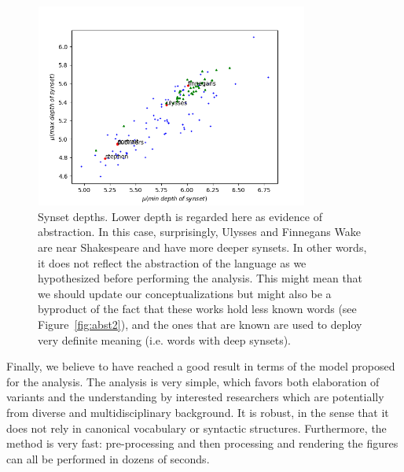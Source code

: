 \documentclass[12pt,fleqn]{article}
\begin{document}
\begin{figure}[!htbp] %
\vspace{-2pt}
\begin{center}
\includegraphics[height=6.7cm,width=9cm]{figs/abst1}%
\caption{Synset depths. Lower depth is regarded here as evidence of abstraction. 
    In this case, surprisingly, Ulysses and Finnegans Wake are near Shakespeare and have more deeper synsets.
    In other words, it does not reflect the abstraction of the language as we hypothesized before performing the analysis.
    This might mean that we should update our conceptualizations but might also be a byproduct of the fact that these works hold less known words (see Figure~\ref{fig:abst2}), and the ones that are known are used to deploy very definite meaning (i.e. words with deep synsets).}
\label{fig:abst1}%
\end{center}
\end{figure}

Finally,
we believe to have reached a good result in terms of the
model proposed for the analysis.
The analysis is very simple, which favors both elaboration of
variants and the understanding by interested researchers which are potentially from
diverse and multidisciplinary background.
It is robust, in the sense that it does not rely in canonical vocabulary or syntactic structures.
Furthermore, the method is very fast:
pre-processing and then processing and rendering the figures can all be performed in dozens of seconds.
\end{document}
